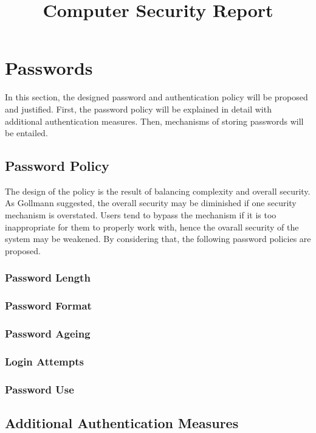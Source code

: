 \documentclass{article}
\title{Computer Security Report}
\begin{document}
%
\maketitle
%

\section{Passwords}
\label{sec:passwd}

In this section, the designed password and authentication policy will be proposed and justified.
First, the password policy will be explained in detail with additional authentication measures.
Then, mechanisms of storing passwords will be entailed.

\subsection{Password Policy}
The design of the policy is the result of balancing complexity and overall security. 
As Gollmann \cite{GollmannDieter2011Cs/D}suggested, the overall security may be diminished 
if one security mechanism is overstated. Users tend to bypass the mechanism if it is too 
inappropriate for them to properly work with, hence the ovarall security of the system 
may be weakened. By considering that, the following password policies are proposed.

\subsubsection{Password Length}

\subsubsection{Password Format}

\subsubsection{Password Ageing}

\subsubsection{Login Attempts}

\subsubsection{Password Use}

\subsection{Additional Authentication Measures}
\end{document}
